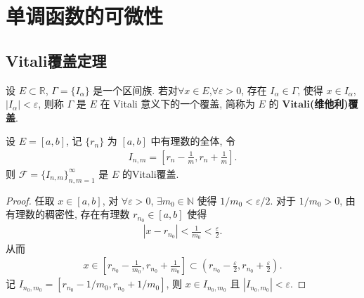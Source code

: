\documentclass[../../main.tex]{subfiles}%
\begin{document}
\section{单调函数的可微性}

\subsection{Vitali覆盖定理}

\begin{definition}[Vitali覆盖]
设 $E\subset\mathbb{R}$, $\Gamma=\{I_\alpha\}$ 是一个区间族. 若对$\forall x\in E$,$\forall \varepsilon>0$, 存在 $I_\alpha\in\Gamma$, 使得 $x\in I_\alpha$, $|I_\alpha|<\varepsilon$, 则称 $\Gamma$ 是 $E$ 在 Vitali 意义下的一个覆盖, 简称为 $E$ 的 $\mathbf{Vitali}$\textbf{(维他利)覆盖}.
\end{definition}

\begin{example}
设 $E=[a,b]$, 记 $\{r_n\}$ 为 $[a,b]$ 中有理数的全体, 令
\begin{align*}
I_{n,m}=\left[r_n-\frac{1}{m}, r_n+\frac{1}{m}\right].
\end{align*}
则 $\mathcal{F}=\{I_{n,m}\}_{n,m=1}^\infty$ 是 $E$ 的Vitali覆盖.
\end{example}
\begin{proof}
任取 $x\in[a,b]$, 对 $\forall\varepsilon>0$, $\exists m_0\in\mathbb{N}$ 使得 $1/m_0<\varepsilon/2$. 对于 $1/m_0>0$, 由有理数的稠密性, 存在有理数 $r_{n_0}\in[a,b]$ 使得
\begin{align*}
|x-r_{n_0}|<\frac{1}{m_0}<\frac{\varepsilon}{2}.
\end{align*}
从而
\begin{align*}
x\in\left[r_{n_0}-\frac{1}{m_0}, r_{n_0}+\frac{1}{m_0}\right]\subset\left(r_{n_0}-\frac{\varepsilon}{2}, r_{n_0}+\frac{\varepsilon}{2}\right).
\end{align*}
记 $I_{n_0,m_0}=[r_{n_0}-1/m_0, r_{n_0}+1/m_0]$, 则 $x\in I_{n_0,m_0}$ 且 $|I_{n_0,m_0}|<\varepsilon$.
\end{proof}
\end{document}
